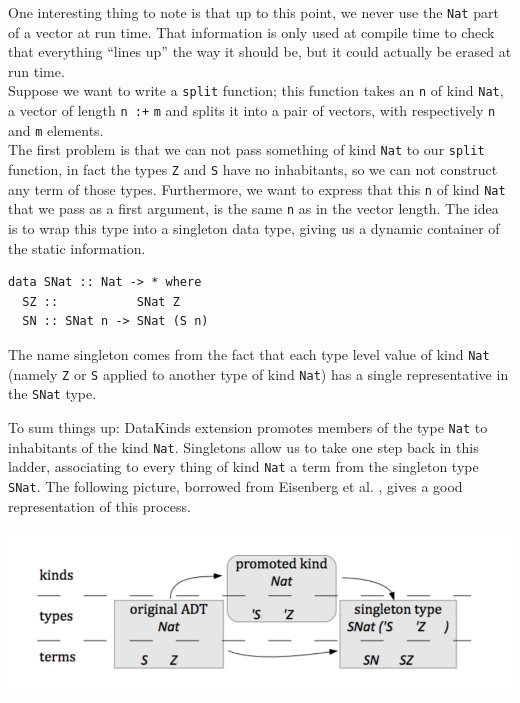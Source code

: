 \documentclass[11pt, titlepage]{article}
\begin{document}
One interesting thing to note is that up to this point, we never use the
\texttt{Nat} part of a vector at run time. That information is only used
at compile time to check that everything ``lines up'' the way it should
be, but it could actually be erased at run time.
\\
Suppose we want to write a \texttt{split} function; this function takes
an \texttt{n} of kind \texttt{Nat}, a vector of length \texttt{n :+} \texttt{m}
and splits it into a pair of vectors, with respectively \texttt{n} and
\texttt{m} elements.
\\
The first problem is that we can not pass something of kind
\texttt{Nat} to our \texttt{split} function, in fact the types \texttt{Z} and \texttt{S} have no inhabitants, so we can not construct any term of those types. Furthermore, we want to
express that this \texttt{n} of kind \texttt{Nat} that we pass as a first argument, is the same \texttt{n} as in the vector length. The idea is to 
wrap this type into a singleton data type, giving us a dynamic container of the static 
information.

\begin{verbatim}
data SNat :: Nat -> * where
  SZ ::           SNat Z
  SN :: SNat n -> SNat (S n)
\end{verbatim}

The name singleton comes from the fact that each type level value of
kind \texttt{Nat} (namely \texttt{Z} or \texttt{S} applied to another
type of kind \texttt{Nat}) has a single representative in the
\texttt{SNat} type.

To sum things up:
DataKinds extension promotes members of the type \texttt{Nat} to inhabitants of the kind \texttt{Nat}. Singletons allow us to take one step back in this ladder, associating to every thing of kind \texttt{Nat} a term from
the singleton type \texttt{SNat}. The following picture, borrowed from Eisenberg et al. \cite{singletons}, gives a good representation of this process.

\includegraphics[width=\textwidth]{singleton.png}\label{singletonImg}
\end{document}
